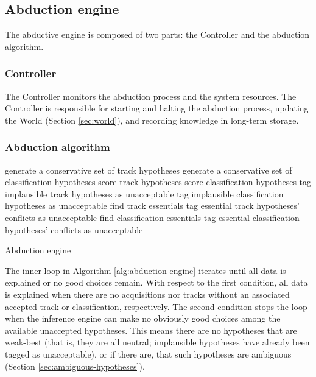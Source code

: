 \documentclass{book}
\begin{document}
\subsection{Abduction engine}

The abductive engine is composed of two parts: the Controller and the abduction
algorithm.

\subsubsection{Controller}
\label{sec:controller}

The Controller monitors the abduction process and the system resources.  The
Controller is responsible for starting and halting the abduction process,
updating the World (Section \ref{sec:world}), and recording knowledge in
long-term storage.

\subsubsection{Abduction algorithm}
\label{sec:abduction-algorithm}

\begin{algorithm}[h]
\begin{algorithmic}
\REPEAT
    \STATE generate a conservative set of track hypotheses
    \STATE generate a conservative set of classification hypotheses
    \STATE score track hypotheses
    \STATE score classification hypotheses
    \STATE tag implausible track hypotheses as unacceptable
    \STATE tag implausible classification hypotheses as unacceptable
        \STATE find track essentials
        \STATE tag essential track hypotheses' conflicts as unacceptable
        \STATE find classification essentials
        \STATE tag essential classification hypotheses' conflicts as
            unacceptable
\end{algorithmic}
\caption{Abduction engine}
\label{alg:abduction-engine}
\end{algorithm}

The inner loop in Algorithm \ref{alg:abduction-engine} iterates until all data
is explained or no good choices remain. With respect to the first condition, all
data is explained when there are no acquisitions nor tracks without an
associated accepted track or classification, respectively. The second
condition stops the loop when the inference engine can make no obviously good
choices among the available unaccepted hypotheses. This means there are no
hypotheses that are weak-best (that is, they are all neutral; implausible
hypotheses have already been tagged as unacceptable), or if there are, that such
hypotheses are ambiguous (Section \ref{sec:ambiguous-hypotheses}).
\end{document}
